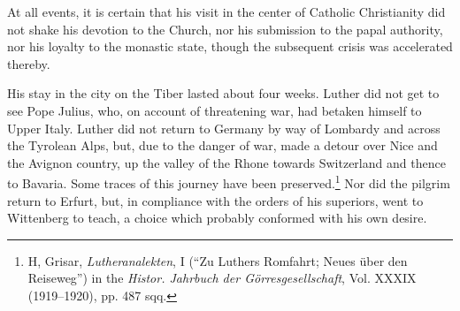 At all events, it is certain that his visit in the center of Catholic
Christianity did not shake his devotion to the Church, nor his submission
to the papal authority, nor his loyalty to the monastic state,
though the subsequent crisis was accelerated thereby.

His stay in the city on the Tiber lasted about four weeks. Luther
did not get to see Pope Julius, who, on account of threatening war,
had betaken himself to Upper Italy. Luther did not return to Germany
by way of Lombardy and across the Tyrolean Alps, but, due
to the danger of war, made a detour over Nice and the Avignon
country, up the valley of the Rhone towards Switzerland and thence
to Bavaria. Some traces of this journey have been preserved.\footnote{
H, Grisar, \textit{Lutheranalekten}, I (``Zu Luthers Romfahrt; Neues über den Reiseweg'')
in the \textit{Histor. Jahrbuch der Görresgesellschaft}, Vol. XXXIX (1919--1920), pp. 487 sqq.}
Nor did the pilgrim return to Erfurt, but, in compliance with the orders
of his superiors, went to Wittenberg to teach, a choice which probably
conformed with his own desire.
